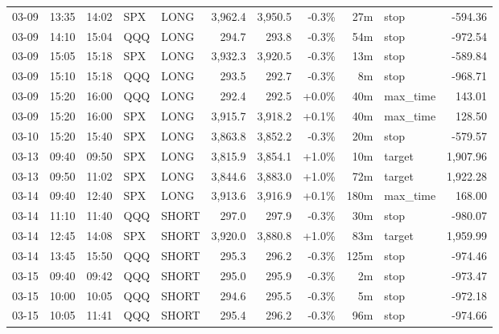 \documentclass[11pt,a4paper,twoside]{article}
\begin{document}
\begin{center}
\begin{longtable}{>{\color{txtmain}}l l l l l r r r r >{\color{txtmain}}l r}
03-09 & 13:35 & 14:02 & SPX & LONG & 3,962.4 & 3,950.5 & \textcolor{lossred}{-0.3\%} & 27m & stop & \textcolor{lossred}{-594.36} \\
03-09 & 14:10 & 15:04 & QQQ & LONG & 294.7 & 293.8 & \textcolor{lossred}{-0.3\%} & 54m & stop & \textcolor{lossred}{-972.54} \\
03-09 & 15:05 & 15:18 & SPX & LONG & 3,932.3 & 3,920.5 & \textcolor{lossred}{-0.3\%} & 13m & stop & \textcolor{lossred}{-589.84} \\
03-09 & 15:10 & 15:18 & QQQ & LONG & 293.5 & 292.7 & \textcolor{lossred}{-0.3\%} & 8m & stop & \textcolor{lossred}{-968.71} \\
03-09 & 15:20 & 16:00 & QQQ & LONG & 292.4 & 292.5 & \textcolor{wingreen}{+0.0\%} & 40m & max\_time & \textcolor{wingreen}{143.01} \\
03-09 & 15:20 & 16:00 & SPX & LONG & 3,915.7 & 3,918.2 & \textcolor{wingreen}{+0.1\%} & 40m & max\_time & \textcolor{wingreen}{128.50} \\
03-10 & 15:20 & 15:40 & SPX & LONG & 3,863.8 & 3,852.2 & \textcolor{lossred}{-0.3\%} & 20m & stop & \textcolor{lossred}{-579.57} \\
03-13 & 09:40 & 09:50 & SPX & LONG & 3,815.9 & 3,854.1 & \textcolor{wingreen}{+1.0\%} & 10m & target & \textcolor{wingreen}{1,907.96} \\
03-13 & 09:50 & 11:02 & SPX & LONG & 3,844.6 & 3,883.0 & \textcolor{wingreen}{+1.0\%} & 72m & target & \textcolor{wingreen}{1,922.28} \\
03-14 & 09:40 & 12:40 & SPX & LONG & 3,913.6 & 3,916.9 & \textcolor{wingreen}{+0.1\%} & 180m & max\_time & \textcolor{wingreen}{168.00} \\
03-14 & 11:10 & 11:40 & QQQ & SHORT & 297.0 & 297.9 & \textcolor{lossred}{-0.3\%} & 30m & stop & \textcolor{lossred}{-980.07} \\
03-14 & 12:45 & 14:08 & SPX & SHORT & 3,920.0 & 3,880.8 & \textcolor{wingreen}{+1.0\%} & 83m & target & \textcolor{wingreen}{1,959.99} \\
03-14 & 13:45 & 15:50 & QQQ & SHORT & 295.3 & 296.2 & \textcolor{lossred}{-0.3\%} & 125m & stop & \textcolor{lossred}{-974.46} \\
03-15 & 09:40 & 09:42 & QQQ & SHORT & 295.0 & 295.9 & \textcolor{lossred}{-0.3\%} & 2m & stop & \textcolor{lossred}{-973.47} \\
03-15 & 10:00 & 10:05 & QQQ & SHORT & 294.6 & 295.5 & \textcolor{lossred}{-0.3\%} & 5m & stop & \textcolor{lossred}{-972.18} \\
03-15 & 10:05 & 11:41 & QQQ & SHORT & 295.4 & 296.2 & \textcolor{lossred}{-0.3\%} & 96m & stop & \textcolor{lossred}{-974.66} \\

\end{longtable}
\end{center}
\end{document}

